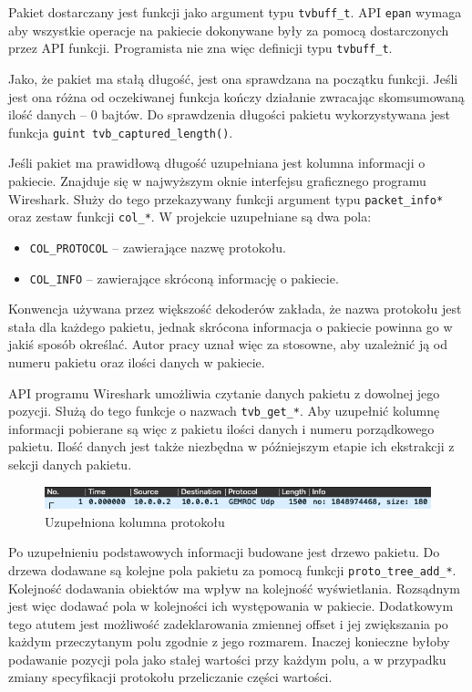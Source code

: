 \documentclass[a4paper, 12pt, twoside, openright]{article}
\begin{document}
Pakiet dostarczany jest funkcji jako argument typu \texttt{tvbuff\_t}. API \texttt{epan} wymaga aby wszystkie operacje
na pakiecie dokonywane były za pomocą dostarczonych przez API funkcji. Programista nie zna więc definicji typu \texttt{tvbuff\_t}.

Jako, że pakiet ma stałą długość, jest ona sprawdzana na początku funkcji. Jeśli jest ona różna od oczekiwanej funkcja
kończy działanie zwracając skomsumowaną ilość danych -- 0 bajtów. Do sprawdzenia długości pakietu wykorzystywana jest funkcja
\texttt{guint tvb\_captured\_length()}.

Jeśli pakiet ma prawidłową długość uzupełniana jest kolumna informacji o pakiecie. Znajduje się w najwyższym oknie interfejsu
graficznego programu Wireshark. Służy do tego przekazywany funkcji argument
typu \texttt{packet\_info*} oraz zestaw funkcji \texttt{col\_*}. W projekcie uzupełniane są dwa pola:
\begin{itemize}
	\item \texttt{COL\_PROTOCOL} -- zawierające nazwę protokołu.
	\item \texttt{COL\_INFO} -- zawierające skróconą informację o pakiecie.
\end{itemize}
Konwencja używana przez większość dekoderów zakłada, że nazwa protokołu jest stała dla każdego pakietu, jednak skrócona
informacja o pakiecie powinna go w jakiś sposób określać. Autor pracy uznał więc za stosowne, aby uzależnić ją
od numeru pakietu oraz ilości danych w pakiecie.

API programu Wireshark umożliwia czytanie danych pakietu z dowolnej jego pozycji. Służą do tego funkcje o nazwach \texttt{tvb\_get\_*}.
Aby uzupełnić kolumnę informacji pobierane są więc z pakietu ilości danych i numeru porządkowego pakietu. Ilość danych jest także niezbędna
w późniejszym etapie ich ekstrakcji z sekcji danych pakietu.

\begin{figure}[h]
	\centering
		\includegraphics[width=1.0\textwidth]{img/screenshot_col.png}
	\caption{Uzupełniona kolumna protokołu}
	\label{fig:col}
\end{figure}

Po uzupełnieniu podstawowych informacji budowane jest drzewo pakietu. Do drzewa dodawane są kolejne pola pakietu za pomocą
funkcji \texttt{proto\_tree\_add\_*}. Kolejność dodawania obiektów ma wpływ na kolejność wyświetlania. Rozsądnym jest więc
dodawać pola w kolejności ich występowania w pakiecie. Dodatkowym tego atutem jest możliwość zadeklarowania zmiennej offset
i jej zwiększania po każdym przeczytanym polu zgodnie z jego rozmarem. Inaczej konieczne byłoby podawanie pozycji pola jako
stałej wartości przy każdym polu, a w przypadku zmiany specyfikacji protokołu przeliczanie części wartości.
\end{document}
